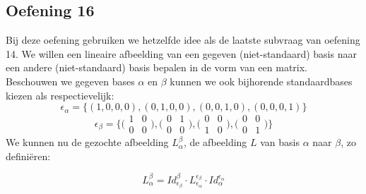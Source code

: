 \documentclass[lineaire_algebra_oplossingen.tex]{subfiles}
\begin{document}
\subsection{Oefening 16}
Bij deze oefening gebruiken we hetzelfde idee als de laatste subvraag van oefening 14. We willen een lineaire afbeelding van een gegeven (niet-standaard) basis naar een andere (niet-standaard) basis bepalen in de vorm van een matrix.\\
Beschouwen we gegeven bases $\alpha$ en $\beta$ kunnen we ook bijhorende standaardbases kiezen als respectievelijk:
\[ \epsilon_\alpha = \{(1,0,0,0),(0,1,0,0),(0,0,1,0),(0,0,0,1)\}\]
\[ \epsilon_\beta = \{\bigl(\begin{smallmatrix} 1&0\\ 0&0 \end{smallmatrix} \bigr),\bigl(\begin{smallmatrix} 0&1\\ 0&0 \end{smallmatrix} \bigr),\bigl(\begin{smallmatrix} 0&0\\ 1&0 \end{smallmatrix} \bigr),\bigl(\begin{smallmatrix} 0&0\\ 0&1 \end{smallmatrix} \bigr)\}\]
We kunnen nu de gezochte afbeelding $L^\beta_\alpha$, de afbeelding $L$ van basis $\alpha$ naar $\beta$, zo defini\"eren:

\[
L^\beta_\alpha = Id^\beta_{\epsilon_\beta}\cdot L^{\epsilon_\beta}_{\epsilon_\alpha}\cdot Id^{\epsilon_\alpha}_{\alpha}
\]
\end{document}

